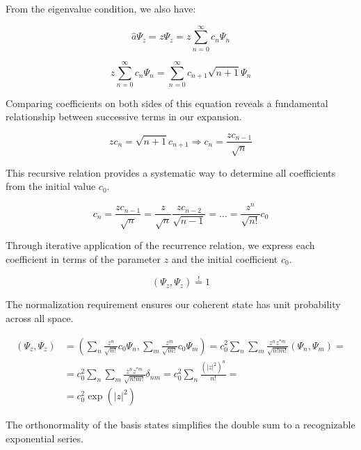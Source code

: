 From the eigenvalue condition, we also have:

\begin{equation}
\hat{a} \Psi_{z}=z \Psi_{z}=z \sum_{n=0}^{\infty} c_{n} \Psi_{n}
\end{equation}

\begin{equation}
z \sum_{n=0}^{\infty} c_{n} \Psi_{n}=\sum_{n=0}^{\infty} c_{n+1} \sqrt{n+1} \Psi_{n}
\end{equation}

Comparing coefficients on both sides of this equation reveals a fundamental relationship between successive terms in our expansion.

\begin{equation}
z c_{n}=\sqrt{n+1} c_{n+1} \Longrightarrow c_{n}=\frac{z c_{n-1}}{\sqrt{n}}
\end{equation}

This recursive relation provides a systematic way to determine all coefficients from the initial value $c_0$.

\begin{equation}
c_{n}=\frac{z c_{n-1}}{\sqrt{n}}=\frac{z}{\sqrt{n}} \frac{z c_{n-2}}{\sqrt{n-1}}=\ldots=\frac{z^{n}}{\sqrt{n!}} c_{0}
\end{equation}

Through iterative application of the recurrence relation, we express each coefficient in terms of the parameter $z$ and the initial coefficient $c_0$.

\begin{equation}
\left(\Psi_{z}, \Psi_{z}\right) \stackrel{!}{=} 1
\end{equation}

The normalization requirement ensures our coherent state has unit probability across all space.

\begin{align}
\left(\Psi_{z}, \Psi_{z}\right) & =\left(\sum_{n} \frac{z^{n}}{\sqrt{n!}} c_{0} \Psi_{n}, \sum_{m} \frac{z^{m}}{\sqrt{m!}} c_{0} \Psi_{m}\right)=c_{0}^{2} \sum_{n} \sum_{m} \frac{z^{n} z^{* m}}{\sqrt{n!m!}}\left(\Psi_{n}, \Psi_{m}\right)= \\
& =c_{0}^{2} \sum_{n} \sum_{m} \frac{z^{n} z^{* m}}{\sqrt{n!m!}} \delta_{n m}=c_{0}^{2} \sum_{n} \frac{\left(|z|^{2}\right)^{n}}{n!}= \\
& =c_{0}^{2} \exp \left(|z|^{2}\right)
\end{align}

The orthonormality of the basis states simplifies the double sum to a recognizable exponential series.

